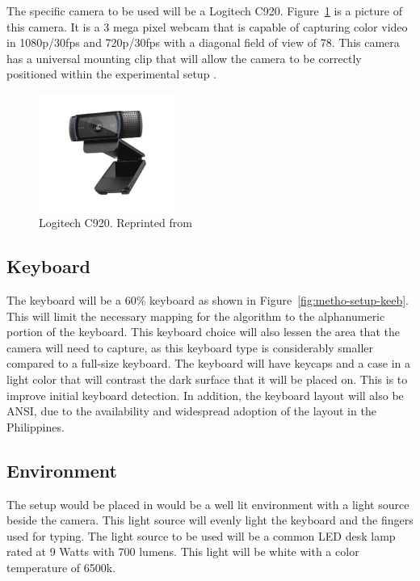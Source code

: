 \documentclass{report}
\begin{document}
The specific camera to be used will be a Logitech C920.
Figure~\ref{fig:metho-setup-cam} is a picture of this camera. It is a 3 mega pixel
webcam that is capable of capturing color video in 1080p/30fps and 720p/30fps
with a diagonal field of view of 78\degree. This camera has a universal mounting
clip that will allow the camera to be correctly positioned within the
experimental setup \parencite{logitech}.

\begin{figure}[H]
	\centering
	\includegraphics[width=0.4\textwidth]{webcam.png}
	\caption{Logitech C920. Reprinted from }
	\label{fig:metho-setup-cam}
	\centering
\end{figure}

\subsection{Keyboard}
\label{section:metho-keeb}

The keyboard will be a 60\% keyboard as shown in
Figure~\ref{fig:metho-setup-keeb}. This will limit the necessary mapping for the
algorithm to the alphanumeric portion of the keyboard. This keyboard choice will
also lessen the area that the camera will need to capture, as this keyboard type
is considerably smaller compared to a full-size keyboard. The keyboard will have
keycaps and a case in a light color that will contrast the dark surface that it
will be placed on. This is to improve initial keyboard detection. In addition,
the keyboard layout will also be ANSI, due to the availability and widespread
adoption of the layout in the Philippines.

\subsection{Environment}
The setup would be placed in would be a well lit environment with a light source
beside the camera. This light source will evenly light the keyboard and the
fingers used for typing. The light source to be used will be a common LED desk
lamp rated at 9 Watts with 700 lumens. This light will be white with a color
temperature of 6500k.
\end{document}
